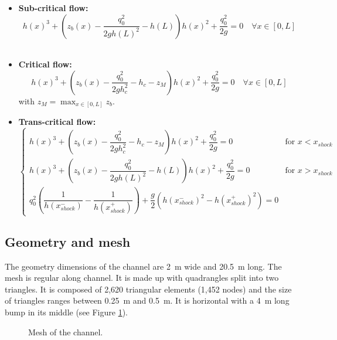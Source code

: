 \begin{itemize}
\item {\bf Sub-critical flow:} 
\begin{equation}
 h(x)^3 + \left( z_b(x) - \dfrac{q_0^2}{2g h(L)^2} - h(L) \right) h(x)^2 + \dfrac{q_0^2}{2g} = 0 \quad \forall x \in [0,L]
\end{equation}
\

\item {\bf Critical flow:}
\begin{equation}
h(x)^3 + \left( z_b(x) - \dfrac{q_0^2}{2g h_c^2} - h_c - z_M \right) h(x)^2 + \dfrac{q_0^2}{2g} = 0 \quad \forall x \in [0,L]  
\end{equation}
with $ z_M = \max_{x \in [0,L]}z_b$.
\

\item {\bf Trans-critical flow:}
\begin{equation}
\begin{cases}
h(x)^3 + \left( z_b(x) - \dfrac{q_0^2}{2g h_c^2} - h_c - z_M \right) h(x)^2 + \dfrac{q_0^2}{2g} = 0 \quad & \text{for  } x < x_{shock}  \\
h(x)^3 + \left( z_b(x) - \dfrac{q_0^2}{2g h(L)^2} - h(L) \right) h(x)^2 + \dfrac{q_0^2}{2g} = 0 \quad &\text{for  } x > x_{shock} \\
q_0^2 \left( \dfrac{1}{h(x_{shock}^-)} - \dfrac{1}{h(x_{shock}^+)} \right) + \dfrac{g}{2} \left( h(x_{shock}^-)^2 -h(x_{shock}^+)^2 \right) = 0
\end{cases}
\end{equation}
\end{itemize}

\subsection{Geometry and mesh}

The geometry dimensions of the channel are 2~m wide and 20.5~m long.
The mesh is regular along channel. It is made up with
quadrangles split into two triangles.
It is composed of 2,620 triangular elements (1,452 nodes)
and the size of triangles ranges between 0.25~m and 0.5~m.
It is horizontal with a 4~m long bump in its middle
(see Figure \ref{t2d:bumpsub:fig:mesh}).

\begin{figure}[!htbp]
 \centering
 \caption{Mesh of the channel.}
 \label{t2d:bumpsub:fig:mesh}
\end{figure}

